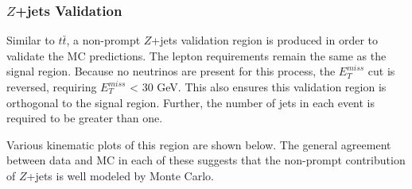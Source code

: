\subsubsection{$Z$+jets Validation}

Similar to $t\bar{t}$, a non-prompt $Z$+jets validation region is produced in order to validate the MC predictions. The lepton requirements remain the same as the signal region. Because no neutrinos are present for this process, the $E_T^{miss}$ cut is reversed, requiring $E_T^{miss}$ < 30 GeV. This also ensures this validation region is orthogonal to the signal region. Further, the number of jets in each event is required to be greater than one. 

Various kinematic plots of this region are shown below. The general agreement between data and MC in each of these suggests that the non-prompt contribution of $Z$+jets is well modeled by Monte Carlo.

